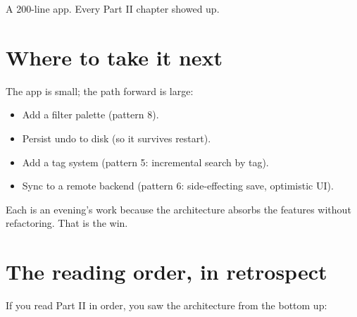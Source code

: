A 200-line app. Every Part II chapter showed up.

\section{Where to take it next}

The app is small; the path forward is large:

\begin{itemize}[leftmargin=*]
  \item Add a filter palette (pattern 8).
  \item Persist undo to disk (so it survives restart).
  \item Add a tag system (pattern 5: incremental search by
    tag).
  \item Sync to a remote backend (pattern 6: side-effecting
    save, optimistic UI).
\end{itemize}

Each is an evening's work because the architecture absorbs the
features without refactoring. That is the win.

\section{The reading order, in retrospect}

If you read Part II in order, you saw the architecture from the
bottom up:


